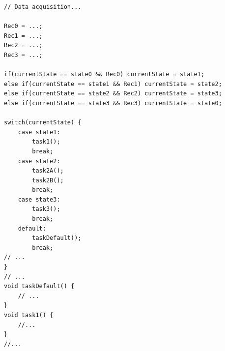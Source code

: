 \documentclass[a4paper,11pt]{beamer}
\begin{document}
\begin{frame}[fragile]
\begin{lstlisting}[style=CStyle]
// Data acquisition...

Rec0 = ...;
Rec1 = ...;
Rec2 = ...;
Rec3 = ...;

if(currentState == state0 && Rec0) currentState = state1;
else if(currentState == state1 && Rec1) currentState = state2;
else if(currentState == state2 && Rec2) currentState = state3;
else if(currentState == state3 && Rec3) currentState = state0;

switch(currentState) {
    case state1:
        task1();
        break;
    case state2:
        task2A();
        task2B();
        break;
    case state3:
        task3();
        break;
    default:
        taskDefault();
        break;
// ...
}
// ...
void taskDefault() {
    // ...
}
void task1() {
    //...
}
//...
\end{lstlisting}
\end{frame}
\end{document}
